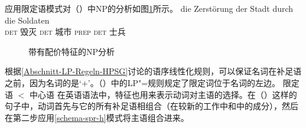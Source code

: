 应用限定语模式对（）中NP的分析如图\ref{Abbildung-die-Zerstorung}所示。
\ea
\gll die          Zerstörung der          Stadt durch         die Soldaten\\
     \textsc{det} 毁灭        \textsc{det} 城市  \textsc{prep} \textsc{det} 士兵\\
\z
\begin{figure}
\centerfit{
\begin{forest}
sm edges
[N\feattab{\spr \sliste{  },\\
           \subcat \sliste{  } }
	[\ibox{1} Det
		[die;\textsc{det}]]
			[N\feattab{\spr \sliste{ \ibox{1} },\\
                   \subcat \sliste{  } }
		[N\feattab{\spr \sliste{ \ibox{1} },\\
                   \subcat \sliste{ \ibox{2} } }
			[N\feattab{\spr \sliste{ \ibox{1} },\\
                                   \subcat \sliste{ \ibox{2}, \ibox{3} } }
				[Zerstörung;毁灭]]
			[\ibox{3} NP{[\type{gen}]}
				[der Stadt; \textsc{det} 城市,roof]]]
		[\ibox{2} PP{[\type{durch}]}
			[durch die Soldaten; \textsc{prep} \textsc{det}士兵,roof]]]]
\end{forest}}
\caption{带有配价特征\sprc 的NP分析}\label{Abbildung-die-Zerstorung} 
\end{figure}%
根据\ref{Abschnitt-LP-Regeln-HPSG}讨论的语序线性化规则，可以保证名词在补足语之前，因为名词的\initialvc 是`$+$'。（）中的LP"=规则规定了限定词位于名词的左边。
\ea
限定语 $<$ 中心语
\z
%
%
在英语语法中，\sprc 特征也用来表示动词对主语的选择\citep*[\S~4.3]{SWB2003a}。在（）这样的句子中，动词首先与它的所有补足语相组合（在较新的工作中\subcatc 和\compsc 中的成分），然后在第二步应用\ref{schema-spr-h}模式将主语组合进来。
